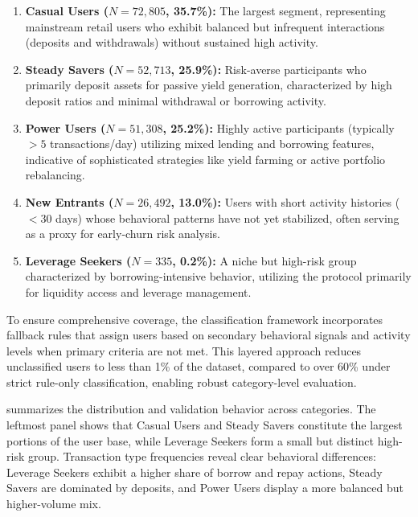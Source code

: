 \documentclass[manuscript,screen,review]{acmart}
\begin{document}
\begin{enumerate}
    \item \textbf{Casual Users ($N=72,805$, 35.7\%):} The largest segment, representing mainstream retail users who exhibit balanced but infrequent interactions (deposits and withdrawals) without sustained high activity.
    
    \item \textbf{Steady Savers ($N=52,713$, 25.9\%):} Risk-averse participants who primarily deposit assets for passive yield generation, characterized by high deposit ratios and minimal withdrawal or borrowing activity.
    
    \item \textbf{Power Users ($N=51,308$, 25.2\%):} Highly active participants (typically $>5$ transactions/day) utilizing mixed lending and borrowing features, indicative of sophisticated strategies like yield farming or active portfolio rebalancing.
    
    \item \textbf{New Entrants ($N=26,492$, 13.0\%):} Users with short activity histories ($<30$ days) whose behavioral patterns have not yet stabilized, often serving as a proxy for early-churn risk analysis.
    
    \item \textbf{Leverage Seekers ($N=335$, 0.2\%):} A niche but high-risk group characterized by borrowing-intensive behavior, utilizing the protocol primarily for liquidity access and leverage management.
\end{enumerate}

To ensure comprehensive coverage, the classification framework incorporates fallback rules that assign users based on secondary behavioral signals and activity levels when primary criteria are not met. This layered approach reduces unclassified users to less than 1\% of the dataset, compared to over 60\% under strict rule-only classification, enabling robust category-level evaluation.

 summarizes the distribution and validation behavior across categories. The leftmost panel shows that Casual Users and Steady Savers constitute the largest portions of the user base, while Leverage Seekers form a small but distinct high-risk group. Transaction type frequencies reveal clear behavioral differences: Leverage Seekers exhibit a higher share of borrow and repay actions, Steady Savers are dominated by deposits, and Power Users display a more balanced but higher-volume mix. 
\end{document}
